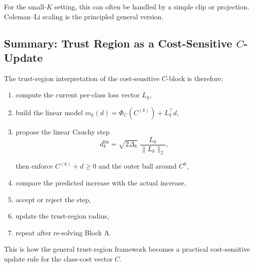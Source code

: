 \documentclass{article}
\begin{document}
For the small-$K$ setting, this can often be handled by a simple clip or projection. Coleman--Li scaling is the principled general version.

\subsection{Summary: Trust Region as a Cost-Sensitive $C$-Update}

The trust-region interpretation of the cost-sensitive $C$-block is therefore:
\begin{enumerate}
    \item compute the current per-class loss vector $L_k$,
    \item build the linear model $m_k(d) = \Phi_C(C^{(k)}) + L_k^\top d$,
    \item propose the linear Cauchy step
    \begin{equation*}
    d_k^{\mathrm{lin}} = \sqrt{2\Delta_k}\;\frac{L_k}{\|L_k\|_2},
    \end{equation*}
    
    
    
    
    then enforce $C^{(k)}+d \geq 0$ and the outer ball around $C^0$,
    \item compare the predicted increase with the actual increase,
    \item accept or reject the step,
    \item update the trust-region radius,
    \item repeat after re-solving Block A.
\end{enumerate}

This is how the general trust-region framework becomes a practical cost-sensitive update rule for the class-cost vector $C$.
\end{document}
